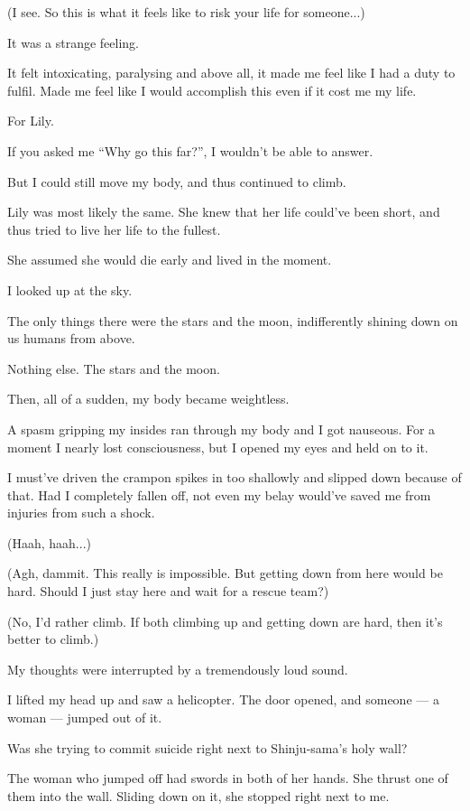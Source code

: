 (I see. So this is what it feels like to risk your life for someone...)

It was a strange feeling.

It felt intoxicating, paralysing and above all, it made me feel like I had a duty to fulfil. Made me feel like I would accomplish this even if it cost me my life.

For Lily.

If you asked me ``Why go this far?'', I wouldn't be able to answer.

But I could still move my body, and thus continued to climb.

Lily was most likely the same. She knew that her life could've been short, and thus tried to live her life to the fullest.

She assumed she would die early and lived in the moment.

I looked up at the sky.

The only things there were the stars and the moon, indifferently shining down on us humans from above.

Nothing else. The stars and the moon.

Then, all of a sudden, my body became weightless.

A spasm gripping my insides ran through my body and I got nauseous. For a moment I nearly lost consciousness, but I opened my eyes and held on to it.

I must've driven the crampon spikes in too shallowly and slipped down because of that. Had I completely fallen off, not even my belay would've saved me from injuries from such a shock.

(Haah, haah...)

(Agh, dammit. This really is impossible. But getting down from here would be hard. Should I just stay here and wait for a rescue team?)

(No, I'd rather climb. If both climbing up and getting down are hard, then it's better to climb.)

My thoughts were interrupted by a tremendously loud sound.

I lifted my head up and saw a helicopter. The door opened, and someone --- a woman --- jumped out of it.

Was she trying to commit suicide right next to Shinju-sama's holy wall?

The woman who jumped off had swords in both of her hands. She thrust one of them into the wall. Sliding down on it, she stopped right next to me.


